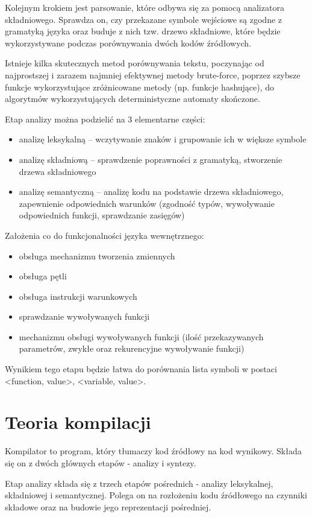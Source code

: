 \documentclass[a4paper,12pt]{article}
\begin{document}
Kolejnym krokiem jest parsowanie, które odbywa się za pomocą analizatora składniowego. Sprawdza on, czy przekazane symbole wejściowe są zgodne z gramatyką języka oraz buduje z nich tzw. drzewo składniowe, które będzie wykorzystywane podczas porównywania dwóch kodów źródłowych.

Istnieje kilka skutecznych metod porównywania tekstu, poczynając od najprostszej i zarazem najmniej efektywnej metody brute-force, poprzez szybsze funkcje wykorzystujące zróżnicowane metody (np. funkcje hashujące), do algorytmów wykorzystujących deterministyczne automaty skończone.

Etap analizy można podzielić na 3 elementarne części:
\begin{itemize}
\item analizę leksykalną – wczytywanie znaków i grupowanie ich w większe symbole
\item analizę składniową – sprawdzenie poprawności z gramatyką, stworzenie drzewa składniowego
\item analizę semantyczną – analizę kodu na podstawie drzewa składniowego, zapewnienie odpowiednich warunków (zgodność typów, wywoływanie odpowiednich funkcji, sprawdzanie zasięgów)
\end{itemize}

Założenia co do funkcjonalności języka wewnętrznego:
\begin{itemize}
\item obsługa mechanizmu tworzenia zmiennych
\item obsługa pętli
\item obsługa instrukcji warunkowych
\item sprawdzanie wywoływanych funkcji
\item mechanizmu obsługi wywoływanych funkcji (ilość przekazywanych parametrów, zwykłe oraz rekurencyjne wywoływanie funkcji)
\end{itemize}
	
Wynikiem tego etapu będzie łatwa do porównania lista symboli w postaci <function, value>, <variable, value>.

\newpage

\section{Teoria kompilacji}

Kompilator to program, który tłumaczy kod źródłowy na kod wynikowy. Składa się on z dwóch głównych etapów - analizy i syntezy.

Etap analizy składa się z trzech etapów pośrednich - analizy leksykalnej, składniowej i semantycznej. Polega on na rozłożeniu kodu źródłowego na czynniki składowe oraz na budowie jego reprezentacji pośredniej.
\end{document}
